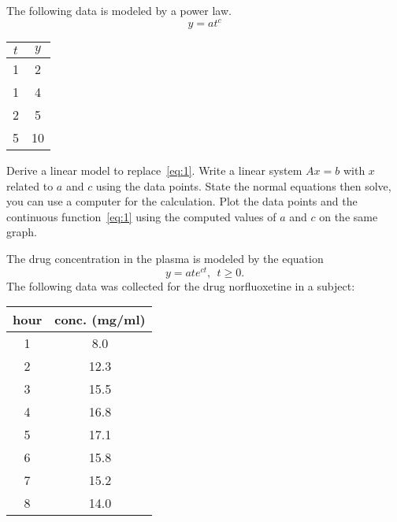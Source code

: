 \documentclass[
	number={6},
]{math486homework}
\begin{document}
\maketitle

\begin{problems}
	\problem The following data is modeled by a power law.
	\begin{equation}
		y = at^{c}
		\label{eq:1}
	\end{equation}
	\begin{table}[H]
		\centering
		\label{tab:1}
		\begin{tabular}{c|c}
			$t$ & $y$\\
			\hline
			1 & 2\\
			1 & 4\\
			2 & 5\\
			5 & 10\\
		\end{tabular}
	\end{table}
	\begin{problems}
		\subproblem Derive a linear model to replace~\eqref{eq:1}. 
		\subproblem Write a linear system $Ax=b$ with $x$ related to $a$ and $c$ using the data points. 
		\subproblem State the normal equations then solve, you can use a computer for the calculation. 
		\subproblem Plot the data points and the continuous function~\eqref{eq:1} using the computed values of $a$ and $c$ on the same graph. 
	\end{problems}
	\problem The drug concentration in the plasma is modeled by the equation
	\begin{equation}
		y = ate^{ct},\ \ t \geq 0.
		\label{eq:2}
	\end{equation}
	The following data was collected for the drug norfluoxetine in a subject:
	\begin{table}[H]
		\centering
		\label{tab:2}
		\begin{tabular}{c|c}
			hour & conc. (mg/ml)\\
			\hline
			1 & 8.0\\
			2 & 12.3\\
			3 & 15.5\\
			4 & 16.8\\
			5 & 17.1\\
			6 & 15.8\\
			7 & 15.2\\
			8 & 14.0\\
		\end{tabular}

\end{table}
\end{problems}
\end{document}
